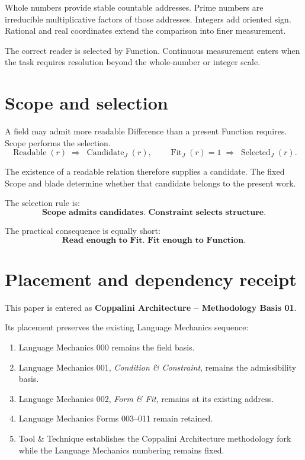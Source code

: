 \documentclass[10pt]{article}
\newcommand{\fit}{\operatorname{Fit}}
\begin{document}
Whole numbers provide stable countable addresses. Prime numbers are irreducible multiplicative factors of those addresses. Integers add oriented sign. Rational and real coordinates extend the comparison into finer measurement.

The correct reader is selected by Function. Continuous measurement enters when the task requires resolution beyond the whole-number or integer scale.

\section{Scope and selection}

A field may admit more readable Difference than a present Function requires. Scope performs the selection.
\[
\boxed{\operatorname{Readable}(r)\;\Longrightarrow\;\operatorname{Candidate}_J(r),\qquad \fit_J(r)=1\;\Longrightarrow\;\operatorname{Selected}_J(r).}
\]

The existence of a readable relation therefore supplies a candidate. The fixed Scope and blade determine whether that candidate belongs to the present work.

The selection rule is:
\[
\boxed{\textbf{Scope admits candidates. Constraint selects structure.}}
\]

The practical consequence is equally short:
\[
\boxed{\textbf{Read enough to Fit. Fit enough to Function.}}
\]

\section{Placement and dependency receipt}

This paper is entered as \textbf{Coppalini Architecture -- Methodology Basis 01}.

Its placement preserves the existing Language Mechanics sequence:
\begin{enumerate}[label=\arabic*.]
\item Language Mechanics 000 remains the field basis.
\item Language Mechanics 001, \emph{Condition \& Constraint}, remains the admissibility basis.
\item Language Mechanics 002, \emph{Form \& Fit}, remains at its existing address.
\item Language Mechanics Forms 003--011 remain retained.
\item Tool \& Technique establishes the Coppalini Architecture methodology fork while the Language Mechanics numbering remains fixed.
\end{enumerate}
\end{document}
